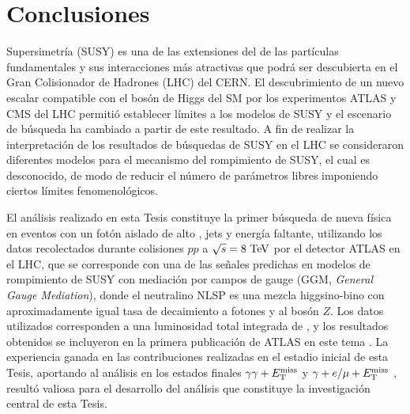 \chapter{Conclusiones}\label{cap:conclusiones}

Supersimetría (SUSY) es una de las extensiones del {\SM} de las partículas
fundamentales y sus interacciones más atractivas que podrá ser descubierta en el
Gran Colisionador de Hadrones (LHC) del CERN. El descubrimiento de un nuevo
escalar compatible con el bosón de Higgs del SM por los experimentos ATLAS
\cite{Aad:2012tfa} y CMS del LHC permitió establecer límites a los modelos de SUSY y el
escenario de búsqueda ha cambiado a partir de este resultado. A fin de realizar
la interpretación de los resultados de búsquedas de SUSY en el LHC se
consideraron diferentes modelos para el mecanismo del rompimiento de SUSY, el
cual es desconocido, de modo de reducir el número de parámetros libres
imponiendo ciertos límites fenomenológicos.

El análisis realizado en esta Tesis constituye la primer búsqueda de nueva
física en eventos con un fotón aislado de alto {\pt}, jets y energía faltante,
utilizando los datos recolectados durante colisiones $pp$ a $\sqrt{s}=8 \tev$
por el detector ATLAS en el LHC, que se corresponde con una de las se\~nales
predichas en modelos de rompimiento de SUSY con mediación por campos de gauge (GGM, \emph{General Gauge
  Mediation}), donde el neutralino NLSP es una mezcla higgsino-bino con
aproximadamente igual tasa de decaimiento a fotones y al bosón $Z$. Los datos
utilizados corresponden a una luminosidad total integrada de {\ilumi}, y los
resultados obtenidos se incluyeron en la primera publicación de ATLAS en este
tema \cite{Aad:2015hea}. La experiencia ganada en las contribuciones realizadas
en el estadio inicial de esta Tesis, aportando al análisis en los estados
finales $\gamma\gamma+E_{\mathrm{T}}^{\mathrm{miss}}$ \cite{Aad2012519,ATLAS-CONF-2014-001} y
$\gamma+e/\mu+E_{\mathrm{T}}^{\mathrm{miss}}$ \cite{ATLAS-CONF-2012-144}, resultó valiosa para el
desarrollo del análisis que constituye la investigación central de esta Tesis.



